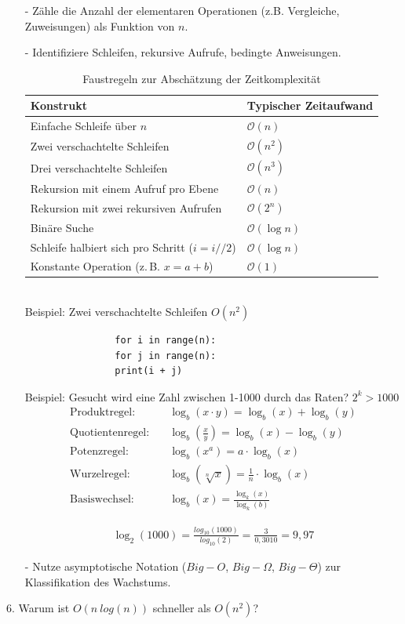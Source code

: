 \documentclass[a4paper,12pt]{article}
\begin{document}
		\begin{enumerate}
			\item[-] Zähle die Anzahl der elementaren Operationen (z.B. Vergleiche, Zuweisungen) als Funktion von $n$.
			\item[-] Identifiziere Schleifen, rekursive Aufrufe, bedingte Anweisungen.
			\begin{table}[h!]
				\centering
				\begin{tabular}{|l|l|}
					\hline
					\textbf{Konstrukt} & \textbf{Typischer Zeitaufwand} \\
					\hline
					Einfache Schleife über $n$ & $\mathcal{O}(n)$ \\
					Zwei verschachtelte Schleifen & $\mathcal{O}(n^2)$ \\
					Drei verschachtelte Schleifen & $\mathcal{O}(n^3)$ \\
					Rekursion mit einem Aufruf pro Ebene & $\mathcal{O}(n)$ \\
					Rekursion mit zwei rekursiven Aufrufen & $\mathcal{O}(2^n)$ \\
					Binäre Suche & $\mathcal{O}(\log n)$ \\
					Schleife halbiert sich pro Schritt ($i = i // 2$) & $\mathcal{O}(\log n)$ \\
					Konstante Operation (z.\,B. $x = a + b$) & $\mathcal{O}(1)$ \\
					\hline
				\end{tabular}
				\caption{Faustregeln zur Abschätzung der Zeitkomplexität}
			\end{table}
			\\Beispiel: Zwei verschachtelte Schleifen $O(n^2)$
			\begin{verbatim}
				for i in range(n):
				for j in range(n):
				print(i + j)
			\end{verbatim}
			
			Beispiel: Gesucht wird eine Zahl zwischen 1-1000 durch das Raten? $2^k > 1000$
			\begin{align*}
				\text{Produktregel:} \quad & \log_b(x \cdot y) = \log_b(x) + \log_b(y) \\
				\text{Quotientenregel:} \quad & \log_b\left(\frac{x}{y}\right) = \log_b(x) - \log_b(y) \\
				\text{Potenzregel:} \quad & \log_b(x^a) = a \cdot \log_b(x) \\
				\text{Wurzelregel:} \quad & \log_b\left(\sqrt[n]{x}\right) = \frac{1}{n} \cdot \log_b(x) \\
				\text{Basiswechsel:} \quad & \log_b(x) = \frac{\log_k(x)}{\log_k(b)}
			\end{align*}
			
			\begin{align*}
				\log_2(1000)=\frac{log_{10}(1000)}{log_{10}(2)}=\frac{3}{0,3010}=9,97
			\end{align*}
			
			\item[-] Nutze asymptotische Notation ($Big-O$, $Big-\Omega$, $Big-\Theta$) zur Klassifikation des Wachstums.
		\end{enumerate}
		6. Warum ist $O(n \ log(n))$ schneller als $O(n^2)$?
\end{document}
